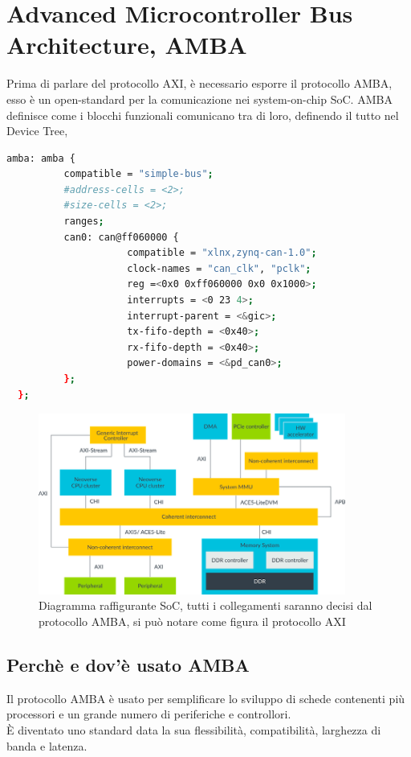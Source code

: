 \section{Advanced Microcontroller Bus Architecture, AMBA}
Prima di parlare del protocollo AXI, è necessario esporre il protocollo AMBA, esso è un open-standard per la comunicazione nei system-on-chip SoC. AMBA definisce come i blocchi funzionali comunicano tra di loro, definendo il tutto nel Device Tree,\cite{amba}
\begin{lstlisting}[language=sh, label=lst:C, caption={Questo è un esempio di un device tree che definisce la comunicazione di un core propretario tramite il protocollo CANBus.}]
  amba: amba {
          compatible = "simple-bus";
          #address-cells = <2>;
          #size-cells = <2>;
          ranges;
          can0: can@ff060000 {
                     compatible = "xlnx,zynq-can-1.0";
                     clock-names = "can_clk", "pclk";
                     reg =<0x0 0xff060000 0x0 0x1000>;
                     interrupts = <0 23 4>;
                     interrupt-parent = <&gic>;
                     tx-fifo-depth = <0x40>;
                     rx-fifo-depth = <0x40>;
                     power-domains = <&pd_can0>;
          };
  };
\end{lstlisting}\clearpage
\begin{figure}
    \centering
    \includegraphics[width=0.9\textwidth]{images/AMBA.png}
    \caption{Diagramma raffigurante SoC, tutti i collegamenti saranno decisi dal protocollo AMBA, si può notare come figura il protocollo AXI\cite{amba}}
    \label{fig:my_label}
\end{figure}
\subsection{Perchè e dov'è usato AMBA}
Il protocollo AMBA è usato per semplificare lo sviluppo di schede contenenti più processori e un grande numero di periferiche e controllori.\\
È diventato uno standard data la sua flessibilità, compatibilità, larghezza di banda e latenza.
\clearpage

